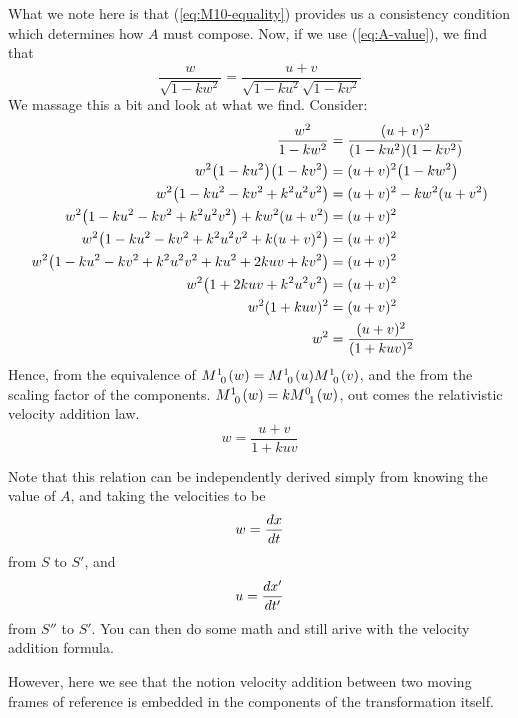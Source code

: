 \documentclass[12pt,a4paper]{article}
\begin{document}
\begin{solution_pset}
		What we note here is that (\ref{eq:M10-equality}) 
		provides us a consistency condition which determines 
		how $A$ must compose. Now, if we use (\ref{eq:A-value}),
		we find that
		\[ 
			\frac{w}{\sqrt{1 - kw^2}} 
			=
			\frac{u+v}{
				\sqrt{1 - ku^2} 
				\sqrt{1 - kv^2} 
			} 
		\]
		We massage this a bit and look at what we find.
		Consider:
		\begin{align*}
			\frac{w^2}{{1 - kw^2}} 
			&=
			\frac{(u+v)^2}{
				{
					(1 - ku^2)
				} 
				{
					(1 - kv^2)
				} 
			} 
			\\
			w^2
			\pqty{1 - ku^2}
			\pqty{1 - kv^2}
			&=
			(u+v)^2 
			\pqty{1 - kw^2}\\
			w^2
			\pqty{1 - ku^2 - kv^2 + k^2 u^2 v^2}
			&=
			(u+v)^2 
			- kw^2(u+v^2)\\
			w^2
			\pqty{1 - ku^2 - kv^2 + k^2 u^2 v^2}
			+ 
			kw^2(u+v^2)
			&=
			(u+v)^2 \\
			w^2
			\pqty{
				1 - 
				ku^2 - 
				kv^2 + k^2 u^2 v^2 + 
				k(u+v)^2
			}
			&=
			(u+v)^2 \\
			w^2
			\pqty{
				1 - 
				ku^2 - 
				kv^2 + k^2 u^2 v^2 + 
				ku^2 + 2kuv + kv^2
			}
			&=
			(u+v)^2 \\
			w^2
			\pqty{
				1 +
				2kuv + 
				k^2 u^2 v^2 
			}
			&=
			(u+v)^2 \\
			w^2
			(1 + kuv)^2
			&=
			(u+v)^2 \\
			w^2
			&=
			\frac{
				(u+v)^2 
			}{
				(1 + kuv)^2
			} 
		\end{align*}
		Hence, from the equivalence of $M\indices{^1_0}(w) = 
		M\indices{^1_0}(u) 
		M\indices{^1_0}(v) 
		$,
		and the from the scaling factor
		of the components.
		$
		M\indices{^1_0}(w)
		=
		k 
		M\indices{^0_1}(w)
		$,
		out comes the relativistic velocity
		addition law.
		\begin{equation}
			\label{eq:w=u+v}
			\boxed{
				w
				=
				\frac{
					u+v
				}{
					1 + kuv
				}
			}
		\end{equation}

		Note that this relation can be independently
		derived simply from knowing the value of $A$,
		and taking the velocities to be 
		\[
			w = \dv{x}{t} 
		\]
		from $S$ to $S'$,
		and
		\[
			u = \dv{x'}{t'} 
		\]
		from $S''$ to $S'$. You can then do some math
		and still arive with the velocity addition formula.

		However, here we see that the notion velocity addition
		between two moving frames of reference
		is embedded in the components of the transformation itself.
		
	\end{solution_pset}
	\newpage
\end{document}
